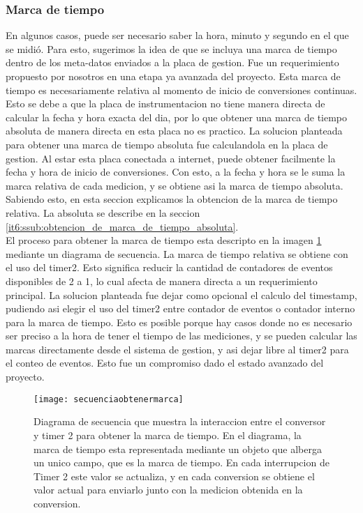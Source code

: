 \subsubsection{Marca de tiempo} %
\label{ssub:marca_de_tiempo}

En algunos casos, puede ser necesario saber la hora, minuto y segundo en el que se midió. Para esto, sugerimos la idea de que se incluya una marca de tiempo dentro de los meta-datos enviados a la placa de gestion. Fue un requerimiento propuesto por nosotros en una etapa ya avanzada del proyecto. Esta marca de tiempo es necesariamente relativa al momento de inicio de conversiones continuas. Esto se debe a que la placa de instrumentacion no tiene manera directa de calcular la fecha y hora exacta del dia, por lo que obtener una marca de tiempo absoluta de manera directa en esta placa no es practico. 
La solucion planteada para obtener una marca de tiempo absoluta fue calculandola en la placa de gestion. Al estar esta placa conectada a internet, puede obtener facilmente la fecha y hora de inicio de conversiones. Con esto, a la fecha y hora se le suma la marca relativa de cada medicion, y se obtiene asi la marca de tiempo absoluta. Sabiendo esto, en esta seccion explicamos la obtencion de la marca de tiempo relativa. La absoluta se describe en la seccion \ref{it6:ssub:obtencion_de_marca_de_tiempo_absoluta}. \\

El proceso para obtener la marca de tiempo esta descripto en la imagen \ref{fig:secuenciaobtenermarca} mediante un diagrama de secuencia. La marca de tiempo relativa se obtiene con el uso del timer2. Esto significa reducir la cantidad de contadores de eventos disponibles de 2 a 1, lo cual afecta de manera directa a un requerimiento principal. La solucion planteada fue dejar como opcional el calculo del timestamp, pudiendo asi elegir el uso del timer2 entre contador de eventos o contador interno para la marca de tiempo. Esto es posible porque hay casos donde no es necesario ser preciso a la hora de tener el tiempo de las mediciones, y se pueden calcular las marcas directamente desde el sistema de gestion, y asi dejar libre al timer2 para el conteo de eventos. Esto fue un compromiso dado el estado avanzado del proyecto.


\begin{figure}[h]
  \centering
  \texttt{[image: secuenciaobtenermarca]}
  \caption[Diagrama de secuencia para la obtencion de una marca de tiempo]{Diagrama de secuencia que muestra la interaccion entre el conversor y timer 2 para obtener la marca de tiempo. En el diagrama, la marca de tiempo esta representada mediante un objeto que alberga un unico campo, que es la marca de tiempo. En cada interrupcion de Timer 2 este valor se actualiza, y en cada conversion se obtiene el valor actual para enviarlo junto con la medicion obtenida en la conversion.}\label{fig:secuenciaobtenermarca}
\end{figure}

